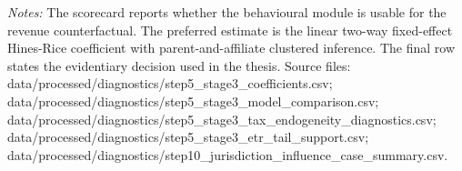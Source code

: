 \begin{table}[H]
\vspace{0.5em}
\begin{minipage}{0.96\textwidth}
\footnotesize\raggedright \textit{Notes:} The scorecard reports whether the behavioural module is usable for the revenue counterfactual. The preferred estimate is the linear two-way fixed-effect Hines-Rice coefficient with parent-and-affiliate clustered inference. The final row states the evidentiary decision used in the thesis. Source files: data/processed/diagnostics/step5\_stage3\_coefficients.csv; data/processed/diagnostics/step5\_stage3\_model\_comparison.csv; data/processed/diagnostics/step5\_stage3\_tax\_endogeneity\_diagnostics.csv; data/processed/diagnostics/step5\_stage3\_etr\_tail\_support.csv; data/processed/diagnostics/step10\_jurisdiction\_influence\_case\_summary.csv.
\end{minipage}
\end{table}
